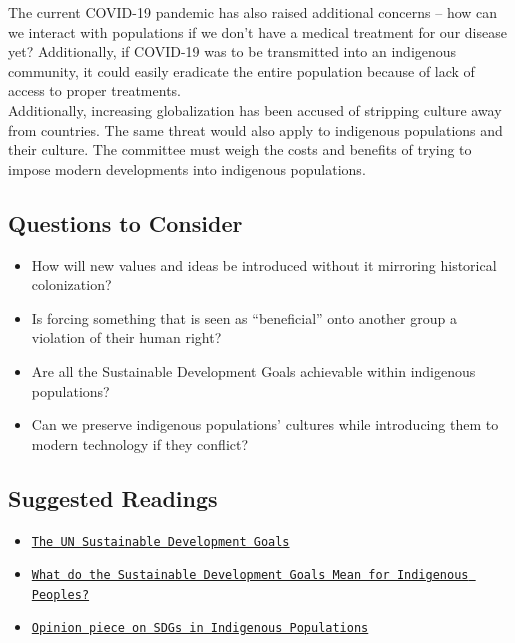 \documentclass[10pt, letterpaper]{article}
\begin{document}
The current COVID-19 pandemic has also raised additional concerns -- how
can we interact with populations if we don't have a medical treatment
for our disease yet? Additionally, if COVID-19 was to be transmitted
into an indigenous community, it could easily eradicate the entire
population because of lack of access to proper treatments. \\

Additionally, increasing globalization has been accused of stripping
culture away from countries. The same threat would also apply to
indigenous populations and their culture. The committee must weigh the
costs and benefits of trying to impose modern developments into
indigenous populations. \\

\subsection{Questions to Consider}

\begin{itemize}
\item
  
  How will new values and ideas be introduced without it mirroring
  historical colonization?
  
\item
  
  Is forcing something that is seen as ``beneficial'' onto another group
  a violation of their human right?
  
\item
  
  Are all the Sustainable Development Goals achievable within indigenous
  populations?
  
\item
  
  Can we preserve indigenous populations' cultures while introducing
  them to modern technology if they conflict?
  
\end{itemize}

\subsection{Suggested Readings}

\begin{itemize}
\item
  
  \texttt{\href{https://sdgs.un.org/goals}{{The UN Sustainable Development Goals}}}
  
\item
  
  
  \texttt{\href{https://www.culturalsurvival.org/publications/cultural-survival-quarterly/what-do-sustainable-development-goals-mean-indigenous}{{What do the Sustainable Development Goals Mean for Indigenous Peoples?}}}
  
\item
  
  
  \texttt{\href{http://www.ipsnews.net/2019/02/sustainable-development-goals-reaching-indigenous-peoples/}{{Opinion piece on SDGs in Indigenous Populations}}}
  
\end{itemize}
\end{document}
